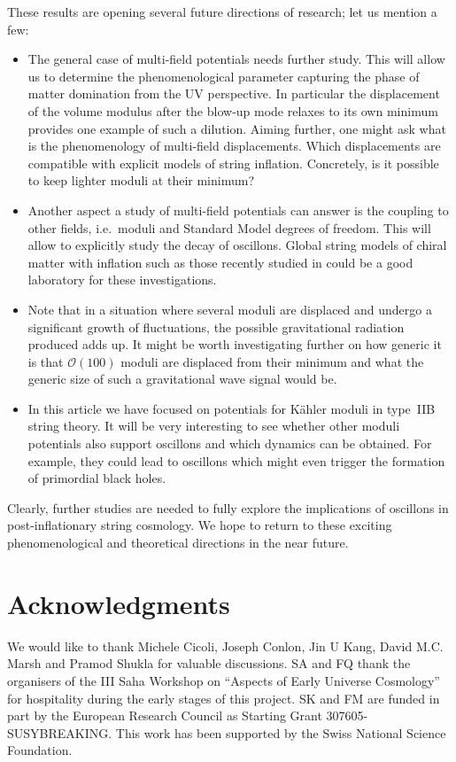 \documentclass[12pt]{article}
\begin{document}
These results are opening several future directions of research; let us mention a few:
\begin{itemize}

\item{} The general case of multi-field potentials needs further study. This will allow us to determine the phenomenological parameter capturing the phase of matter domination from the UV perspective. In particular the displacement of the volume modulus after the blow-up mode relaxes to its own minimum provides one example of such a dilution. Aiming further, one might ask what is the phenomenology of multi-field displacements. Which displacements are compatible with explicit models of string inflation. Concretely, is it possible to keep lighter moduli at their minimum?

\item{} Another aspect a study of multi-field potentials can answer is the coupling to other fields, i.e.~moduli and Standard Model degrees of freedom. This will allow to explicitly study the decay of oscillons. Global string models of chiral matter with inflation such as those recently studied in \cite{Cicoli:2017shd} could be a good laboratory for these investigations.

\item{} Note that in a situation where several moduli are displaced and undergo a significant growth of fluctuations, the possible gravitational radiation produced adds up. It might be worth investigating further on how generic it is that $\mathcal{O}(100)$ moduli are displaced from their minimum and what the generic size of such a gravitational wave signal would be.

\item{} In this article we have focused on potentials for K\"ahler moduli in type~IIB string theory. It will be very interesting to see whether other moduli potentials also support oscillons and which dynamics can be obtained. 
For example, they could lead to oscillons which might even trigger the formation of primordial black holes.

\end{itemize}
Clearly, further studies are needed to fully explore the  implications of oscillons in post-inflationary string cosmology. We hope to return to these exciting phenomenological and theoretical directions in the near future. 



\section*{Acknowledgments}
We would like to thank Michele Cicoli, Joseph Conlon, Jin U Kang, David M.C. Marsh and Pramod Shukla for valuable discussions. SA and FQ thank the organisers of the III Saha Workshop on ``Aspects of Early Universe Cosmology''  for hospitality during the early stages of this project. SK and FM are funded in part by the European Research Council as Starting Grant 307605-SUSYBREAKING. This work has been supported by the Swiss National Science Foundation.
\end{document}
